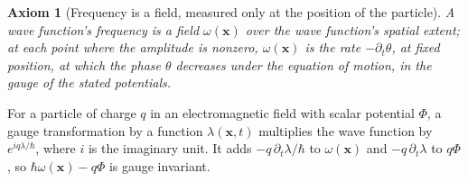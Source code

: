 \documentclass[aps,prd,onecolumn,tightenlines,nofootinbib,notitlepage,11pt,floatfix]{revtex4-2}
\theoremstyle{indentedtheorem}
\newtheorem{axiom}{Axiom}
\begin{document}
\begin{axiom}[Frequency is a field, measured only at the position of the particle]\label{ax:local_frequency}
A wave function's frequency is a field $\omega(\mathbf{x})$ over the wave function's spatial extent; at each point where the amplitude is nonzero, $\omega(\mathbf{x})$ is the rate $-\partial_t\theta$, at fixed position, at which the phase $\theta$ decreases under the equation of motion, in the gauge of the stated potentials.
\end{axiom}

\noindent For a particle of charge $q$ in an electromagnetic field with scalar potential $\Phi$, a gauge transformation by a function $\lambda(\mathbf{x},t)$ multiplies the wave function by $e^{iq\lambda/\hbar}$, where $i$ is the imaginary unit. It adds $-q\,\partial_t\lambda/\hbar$ to $\omega(\mathbf{x})$ and $-q\,\partial_t\lambda$ to $q\Phi$, so $\hbar\omega(\mathbf{x})-q\Phi$ is gauge invariant.
\end{document}
